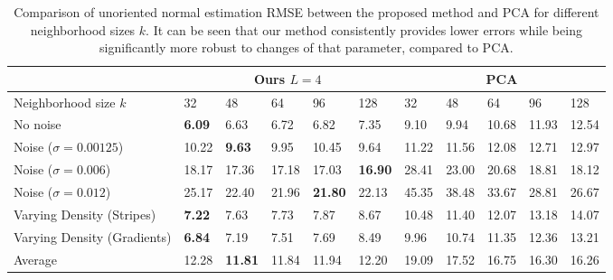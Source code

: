 \documentclass[10pt,twocolumn,letterpaper]{article}
\begin{document}
\begin{table*}[h]
\small
\centering
\begin{tabular}{llllll|lllll}
\toprule
& \multicolumn{5}{c}{Ours $L=4$} & \multicolumn{5}{c}{PCA} \\
\midrule
 Neighborhood size $k$ & 32  &  48  & 64 & 96 & 128 & 32  &  48  & 64 & 96 & 128  \\ 
\midrule
No noise  & \textbf{6.09}  & 6.63  & 6.72 & 6.82 & 7.35 & 9.10  &  9.94 & 10.68 & 11.93 & 12.54  \\ 
Noise ($\sigma = 0.00125$)  & 10.22 & \textbf{9.63} & 9.95 & 10.45 & 9.64 & 11.22 & 11.56  & 12.08 & 12.71  & 12.97\\ 
Noise ($\sigma  = 0.006$)  & 18.17 & 17.36 & 17.18 & 17.03 & \textbf{16.90} & 28.41 & 23.00 & 20.68 & 18.81 & 18.12 \\ 
Noise ($\sigma  = 0.012$)  & 25.17 & 22.40 & 21.96 & \textbf{21.80} & 22.13 & 45.35 & 38.48 & 33.67 & 28.81 & 26.67 \\ 
Varying Density (Stripes)   & \textbf{7.22}  & 7.63  & 7.73  & 7.87  & 8.67 & 10.48  & 11.40  & 12.07  & 13.18  & 14.07\\
Varying Density (Gradients)   & \textbf{6.84} & 7.19 & 7.51 & 7.69 & 8.49 & 9.96 & 10.74 & 11.35 & 12.36 & 13.21\\ 
\midrule
Average    & 12.28 &  \textbf{11.81} & 11.84 & 11.94 & 12.20 & 19.09 & 17.52 & 16.75 & 16.30 & 16.26 \\ 
\bottomrule
\end{tabular}
\caption{Comparison of unoriented normal estimation RMSE between the proposed method and PCA for different neighborhood sizes $k$. It can be seen that our method consistently provides lower errors while being significantly more robust to changes of that parameter, compared to PCA.}
\label{tab:normal_result_comp}
\vspace{-0.3cm}
\end{table*}
\end{document}
